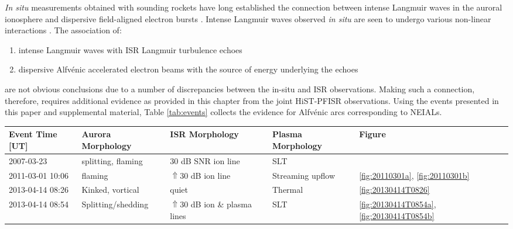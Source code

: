 \textit{In situ} measurements obtained with sounding rockets have long established the connection between intense Langmuir waves in the auroral ionosphere and dispersive field-aligned electron bursts \citep{ergun1999a,stasiewicz1996}. 
Intense Langmuir waves observed \textit{in situ} are seen to undergo various non-linear interactions \citep{boehm1987,gough1990,ergun1999b}.
The association of:
\begin{enumerate}
    \item intense Langmuir waves with ISR Langmuir turbulence echoes
    \item dispersive Alfvénic accelerated electron beams with the source of energy underlying the echoes
\end{enumerate}  
are not obvious conclusions due to a number of discrepancies between the in-situ and ISR observations. 
Making such a connection, therefore, requires additional evidence as provided in this chapter from the joint HiST-PFISR observations.
Using the events presented in this paper and supplemental material, Table \ref{tab:events} collects the evidence for Alfvénic arcs corresponding to NEIALs.
\begin{sidewaystable}\centering
    \caption{Morphologies of events detailed in the paper and supplemental material. SLT=Strong Langmuir Turbulence}
    \label{tab:events}
    \begin{tabular}{lllll}
        \toprule
        Event Time [UT] & Aurora Morphology & ISR Morphology & Plasma Morphology & Figure \\
        \midrule
        2007-03-23 & splitting, flaming & 30 dB SNR ion line & SLT & \\
        2011-03-01 10:06 & flaming & $\Uparrow30$ dB ion line & Streaming upflow & \ref{fig:20110301a}, \ref{fig:20110301b} \\
        2013-04-14 08:26 & Kinked, vortical & quiet & Thermal & \ref{fig:20130414T0826} \\
        2013-04-14 08:54 & Splitting/shedding & $\Uparrow30$ dB ion \& plasma lines & SLT & \ref{fig:20130414T0854a}, \ref{fig:20130414T0854b} \\
        \bottomrule
    \end{tabular}
\end{sidewaystable}
